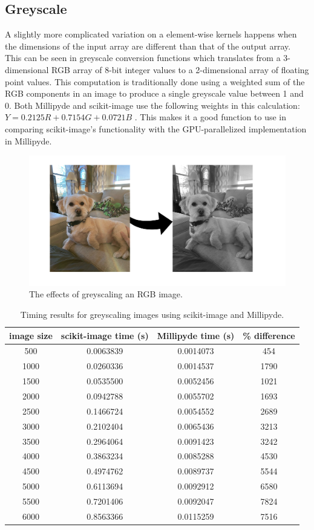 \subsection{Greyscale}

 A slightly more complicated variation on a element-wise kernels happens when the dimensions of the input array are different than that of the output array. This can be seen in greyscale conversion functions which translates from a 3-dimensional RGB array of 8-bit integer values to a 2-dimensional array of floating point values. This computation is traditionally done using a weighted sum of the RGB components in an image to produce a single greyscale value between 1 and 0. Both Millipyde and scikit-image use the following weights in this calculation: $Y = 0.2125 R + 0.7154 G + 0.0721 B$ \cite{skirgb2grey}. 
This makes it a good function to use in comparing scikit-image's functionality with the GPU-parallelized implementation in Millipyde. 

\begin{figure}[hbtp]
\includegraphics[width=\textwidth]{figures/GreyscaleExample.png}
\centering
\caption{The effects of greyscaling an RGB image.}
\label{greyscaleExample}
\end{figure}

\begin{table}[H]
\centering
\begin{tabular}{ |c|c|c|c| } 
\hline
image size & scikit-image time (s) & Millipyde time (s) & \% difference \\
\hline
500 & 0.0063839 & 0.0014073 & 454 \\
1000 & 0.0260336&0.0014537&1790 \\
1500&0.0535500&0.0052456&1021 \\
2000&0.0942788&0.0055702&1693 \\
2500&0.1466724&0.0054552&2689 \\
3000&0.2102404&0.0065436&3213 \\ 
3500&0.2964064&0.0091423&3242 \\
4000&0.3863234&0.0085288&4530 \\
4500&0.4974762&0.0089737&5544 \\
5000&0.6113694&0.0092912&6580 \\
5500&0.7201406&0.0092047&7824 \\
6000&0.8563366&0.0115259&7516 \\
\hline
\end{tabular}
\caption{Timing results for greyscaling images using scikit-image and Millipyde.}
\label{greyscaleTable}
\end{table}

